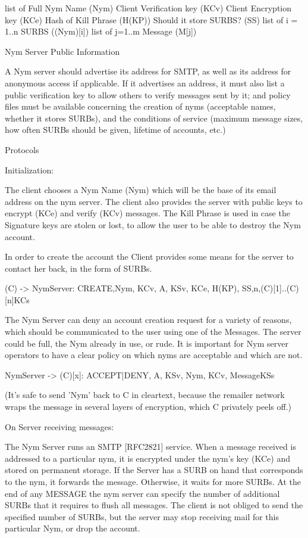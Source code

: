 list of {
  Full Nym Name (Nym)
  Client Verification key (KCv)
  Client Encryption key (KCe)
  Hash of Kill Phrase (H(KP))
  Should it store SURBS? (SS)
  list of i = 1..n {
    SURBS ((Nym)[i])
  }
  list of j=1..m {
    Message (M[j])
  }
}

Nym Server Public Information

A Nym server should advertise its address for SMTP, as well as its address
for anonymous access if applicable. If it advertises an address, it must
also list a public verification key to allow others to verify messages
sent by it; and policy files must be available concerning the creation
of nyms (acceptable names, whether it stores SURBs), and the conditions
of service (maximum message sizes, how often SURBs should be given,
lifetime of accounts, etc.)

Protocols

Initialization:

The client chooses a Nym Name (Nym) which will be the base of its
email address on the nym server. The client also provides the server
with public keys to encrypt (KCe) and verify (KCv) messages. The Kill
Phrase is used in case the Signature keys are stolen or lost, to allow
the user to be able to destroy the Nym account.

In order to create the account the Client provides some means for the
server to contact her back, in the form of SURBs.

(C) -> NymServer: {CREATE,Nym, KCv, A, KSv, KCe, H(KP), SS,n,(C)[1]..(C)[n]}KCs

The Nym Server can deny an account creation request for a variety of
reasons, which should be communicated to the user using one of the
Messages. The server could be full, the Nym already in use, or rude.
It is important for Nym server operators to have a clear policy on
which nyms are acceptable and which are not.

NymServer -> (C)[x]: {ACCEPT|DENY, A, KSv, Nym, KCv, Message}KSs

(It's safe to send 'Nym' back to C in cleartext, because the remailer
network wraps the message in several layers of encryption, which C
privately peels off.)

On Server receiving messages:

The Nym Server runs an SMTP [RFC2821] service. When a message received
is addressed to a particular nym, it is encrypted under the nym's key
(KCe) and stored on permanent storage. If the Server has a SURB on
hand that corresponds to the nym, it forwards the message. Otherwise,
it waits for more SURBs. At the end of any MESSAGE the nym server can
specify the number of additional SURBs that it requires to flush all
messages. The client is not obliged to send the specified number of
SURBs, but the server may stop receiving mail for this particular Nym,
or drop the account.

